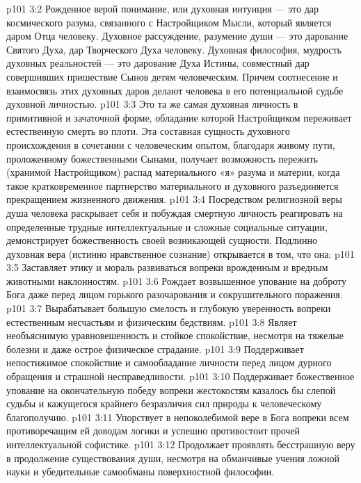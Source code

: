 \vs p101 3:2 Рожденное верой понимание, или духовная интуиция --- это дар космического разума, связанного с Настройщиком Мысли, который является даром Отца человеку. Духовное рассуждение, разумение души --- это дарование Святого Духа, дар Творческого Духа человеку. Духовная философия, мудрость духовных реальностей --- это дарование Духа Истины, совместный дар совершивших пришествие Сынов детям человеческим. Причем соотнесение и взаимосвязь этих духовных даров делают человека в его потенциальной судьбе духовной личностью.
\vs p101 3:3 Это та же самая духовная личность в примитивной и зачаточной форме, обладание которой Настройщиком переживает естественную смерть во плоти. Эта составная сущность духовного происхождения в сочетании с человеческим опытом, благодаря живому пути, проложенному божественными Сынами, получает возможность пережить (хранимой Настройщиком) распад материального «я» разума и материи, когда такое кратковременное партнерство материального и духовного разъединяется прекращением жизненного движения.
\vs p101 3:4 Посредством религиозной веры душа человека раскрывает себя и побуждая смертную личность реагировать на определенные трудные интеллектуальные и сложные социальные ситуации, демонстрирует божественность своей возникающей сущности. Подлинно духовная вера (истинно нравственное сознание) открывается в том, что она:
\vs p101 3:5 \bibnobreakspace Заставляет этику и мораль развиваться вопреки врожденным и вредным животными наклонностям.
\vs p101 3:6 \bibnobreakspace Рождает возвышенное упование на доброту Бога даже перед лицом горького разочарования и сокрушительного поражения.
\vs p101 3:7 \bibnobreakspace Вырабатывает большую смелость и глубокую уверенность вопреки естественным несчастьям и физическим бедствиям.
\vs p101 3:8 \bibnobreakspace Являет необъяснимую уравновешенность и стойкое спокойствие, несмотря на тяжелые болезни и даже острое физическое страдание.
\vs p101 3:9 \bibnobreakspace Поддерживает непостижимое спокойствие и самообладание личности перед лицом дурного обращения и страшной несправедливости.
\vs p101 3:10 \bibnobreakspace Поддерживает божественное упование на окончательную победу вопреки жестокостям казалось бы слепой судьбы и кажущегося крайнего безразличия сил природы к человеческому благополучию.
\vs p101 3:11 \bibnobreakspace Упорствует в непоколебимой вере в Бога вопреки всем противоречащим ей доводам логики и успешно противостоит прочей интеллектуальной софистике.
\vs p101 3:12 \bibnobreakspace Продолжает проявлять бесстрашную веру в продолжение существования души, несмотря на обманчивые учения ложной науки и убедительные самообманы поверхностной философии.
